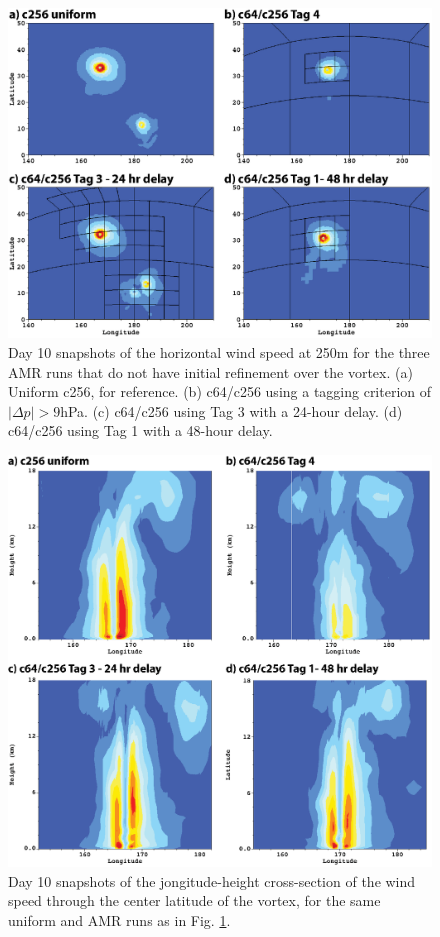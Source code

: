 \begin{figure}
    \centerline{%
    \noindent
    \includegraphics[width=\textwidth,height=\textheight,keepaspectratio]{Chap3/day10_wind_amrdelayed-01.eps}}
    \caption{
    Day 10 snapshots of the horizontal wind speed at 250m for the three AMR runs
    that do not have initial refinement over the vortex. (a) Uniform c256, for reference.
    (b) c64/c256 using a tagging criterion of $|\Delta p| > 9$hPa. (c) c64/c256
    using Tag 3 with a 24-hour delay. (d) c64/c256 using Tag 1 with a 48-hour delay.
}%
    \label{fig:delayhwind}
\end{figure}

\begin{figure}
    \centerline{%
    \noindent
    \includegraphics[width=\textwidth,height=\textheight,keepaspectratio]{Chap3/day10_vertwind_amrdelayed-01.eps}}
    \caption{
    Day 10 snapshots of the jongitude-height cross-section
     of the wind speed through the center
    latitude of the vortex, for the same
    uniform and AMR runs as in Fig. \ref{fig:delayhwind}.
}%
    \label{fig:delayvertwind}
\end{figure}
 
